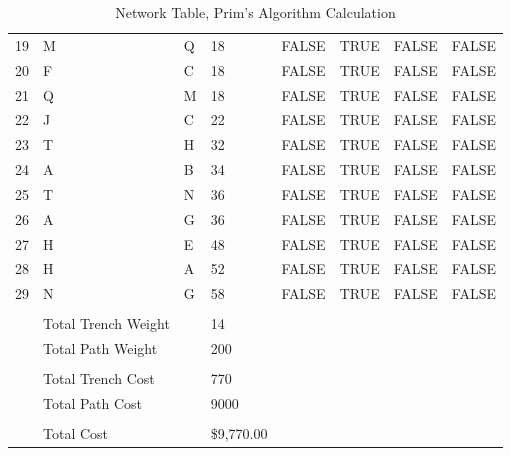 \documentclass[11pt]{book}
\renewcommand{\=}[1]{\stackrel{#1}{=}} %
\theoremstyle{definition}
\theoremstyle{remark}
\begin{document}
\begin{table}[]
\begin{tabular}{llllllll}
19 & M & Q & 18 & FALSE & TRUE & FALSE & \cellcolor[HTML]{FFCCC9}FALSE \\
20 & F & C & 18 & FALSE & TRUE & FALSE & \cellcolor[HTML]{FFCCC9}FALSE \\
21 & Q & M & 18 & FALSE & TRUE & FALSE & \cellcolor[HTML]{FFCCC9}FALSE \\
22 & J & C & 22 & FALSE & TRUE & FALSE & \cellcolor[HTML]{FFCCC9}FALSE \\
23 & T & H & 32 & FALSE & TRUE & FALSE & \cellcolor[HTML]{FFCCC9}FALSE \\
24 & A & B & 34 & FALSE & TRUE & FALSE & \cellcolor[HTML]{FFCCC9}FALSE \\
25 & T & N & 36 & FALSE & TRUE & FALSE & \cellcolor[HTML]{FFCCC9}FALSE \\
26 & A & G & 36 & FALSE & TRUE & FALSE & \cellcolor[HTML]{FFCCC9}FALSE \\
27 & H & E & 48 & FALSE & TRUE & FALSE & \cellcolor[HTML]{FFCCC9}FALSE \\
28 & H & A & 52 & FALSE & TRUE & FALSE & \cellcolor[HTML]{FFCCC9}FALSE \\
29 & N & G & 58 & FALSE & TRUE & FALSE & \cellcolor[HTML]{FFCCC9}FALSE \\
 &  &  &  &  &  &  &  \\
 & Total Trench Weight &  & 14 &  &  &  &  \\
 & Total Path Weight &  & 200 &  &  &  &  \\
 &  &  &  &  &  &  &  \\
 & Total Trench Cost &  & 770 &  &  &  &  \\
 & Total Path Cost &  & 9000 &  &  &  &  \\
 &  &  &  &  &  &  &  \\
 & \cellcolor[HTML]{9AFF99}Total Cost & \cellcolor[HTML]{9AFF99} & \cellcolor[HTML]{9AFF99}\$9,770.00 &  &  &  & 
\end{tabular}
\caption{Network Table, Prim's Algorithm Calculation}
\label{tab:my-table}
\end{table}
\end{document}
